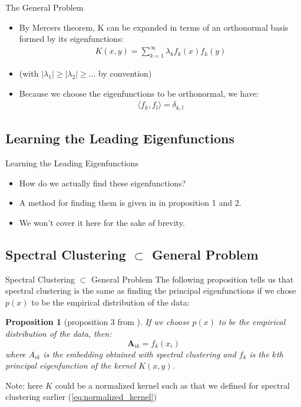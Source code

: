 \documentclass[aspectratio=169]{beamer}
\newtheorem{prop}{Proposition}
\begin{document}
\begin{frame}{The General Problem}
  \begin{itemize}
    \item By Mercers theorem, K can be expanded in terms of an orthonormal basis formed by its eigenfunctions:
      \begin{align}
        K(x,y) = \sum_{k=1}^{\infty} \lambda_{k} f_{k}(x) f_{k}(y)
      \end{align}
    \item (with $|\lambda_{1}| \geq |\lambda_{2}| \geq \ldots$ by convention)
    \item Because we choose the eigenfunctions to be orthonormal, we have:
      \begin{align*}
        \langle f_{k},f_{l} \rangle = \delta_{k,l}
      \end{align*}
  \end{itemize}
\end{frame}

\subsection{Learning the Leading Eigenfunctions}
\begin{frame}{Learning the Leading Eigenfunctions}
  \begin{itemize}
    \item How do we actually find these eigenfunctions?
    \item A method for finding them is given in \cite{bengio2003learning} in proposition 1 and 2.
    \item We won't cover it here for the sake of brevity. 
  \end{itemize}
\end{frame}

\subsection{Spectral Clustering \texorpdfstring{$\subset$}{TEXT} General Problem}
\begin{frame}{Spectral Clustering \texorpdfstring{$\subset$}{TEXT} General Problem}
  The following proposition tells us that spectral clustering is the same as finding the principal eigenfunctions if we chose $p(x)$ to be the empirical distribution of the data:
  \begin{prop}[proposition 3 from \cite{bengio2003learning}] \label{prop:sc}
  If we choose $p(x)$ to be the empirical distribution of the data, then:
  \begin{equation}
    \mathbf{A}_{ik} = f_{k} (x_{i}) 
  \end{equation}
  where $A_{ik}$ is the embedding obtained with spectral clustering and $f_{k}$ is the $k$th principal eigenfunction of the kernel $K(x,y)$.
  \end{prop}
  Note: here $K$ could be a normalized kernel such as that we defined for spectral clustering earlier (\cref{eq:normalized_kernel})
\end{frame}
\end{document}
